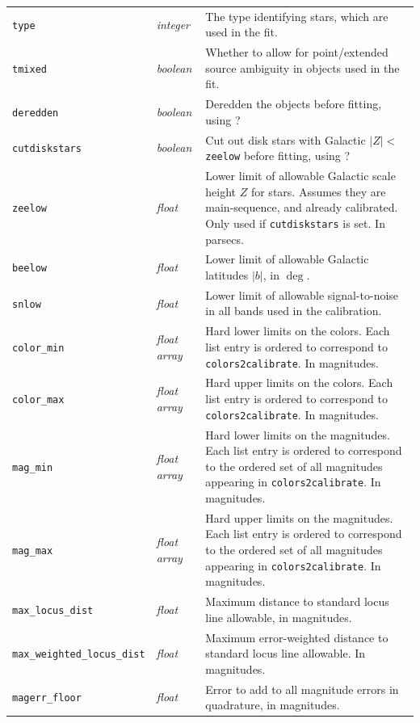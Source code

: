 \documentclass{report}
\begin{document}
\begin{center}
\begin{longtable}{llp{3.5in}}
\verb|type| & {\it integer} & The type identifying stars, which are used in the fit. \\
\verb|tmixed| & {\it boolean} & Whether to allow for point/extended source ambiguity in objects used in the fit. \\
\verb|deredden| & {\it boolean} & Deredden the objects before fitting, using \citet{bib:sfd}? \\
\verb|cutdiskstars| & {\it boolean} & Cut out disk stars with Galactic $|Z|<$ \verb|zeelow| before fitting, using \citet{bib:juric}?  \\
\verb|zeelow| & {\it float} & Lower limit of allowable Galactic scale height $Z$ for stars. Assumes they are main-sequence, and already calibrated. Only used if \verb|cutdiskstars| is set. In parsecs. \\
\verb|beelow| & {\it float} & Lower limit of allowable Galactic latitudes $|b|$, in $\deg$. \\
\verb|snlow| & {\it float} & Lower limit of allowable signal-to-noise in all bands used in the calibration. \\
\verb|color_min| & {\it float array} & Hard lower limits on the colors. Each list entry is ordered to correspond to \verb|colors2calibrate|. In magnitudes.  \\
\verb|color_max| & {\it float array} & Hard upper limits on the colors. Each list entry is ordered to correspond to \verb|colors2calibrate|.  In magnitudes. \\
\verb|mag_min| & {\it float array} & Hard lower limits on the magnitudes. Each list entry is ordered to correspond to the ordered set of all magnitudes appearing in \verb|colors2calibrate|. In magnitudes.  \\
\verb|mag_max| & {\it float array} & Hard upper limits on the magnitudes. Each list entry is ordered to correspond to the ordered set of all magnitudes appearing in \verb|colors2calibrate|.  In magnitudes. \\
\verb|max_locus_dist| & {\it float} & Maximum distance to standard locus line allowable, in magnitudes.  \\
\verb|max_weighted_locus_dist| & {\it float} & Maximum error-weighted distance to standard locus line allowable. In magnitudes.  \\
\verb|magerr_floor| & {\it float} & Error to add to all magnitude errors in quadrature, in magnitudes.  \\

\end{longtable}
\end{center}
\end{document}
